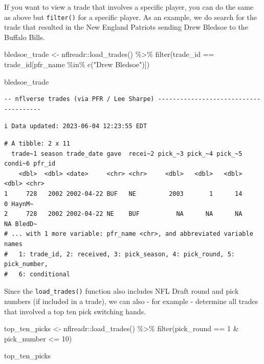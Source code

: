 \documentclass[
  letterpaper,
]{krantz}
\newenvironment{Shaded}{\begin{snugshade}}{\end{snugshade}}
\newcommand{\DecValTok}[1]{\textcolor[rgb]{0.68,0.00,0.00}{#1}}
\newcommand{\FunctionTok}[1]{\textcolor[rgb]{0.28,0.35,0.67}{#1}}
\newcommand{\NormalTok}[1]{\textcolor[rgb]{0.00,0.23,0.31}{#1}}
\newcommand{\OtherTok}[1]{\textcolor[rgb]{0.00,0.23,0.31}{#1}}
\newcommand{\SpecialCharTok}[1]{\textcolor[rgb]{0.37,0.37,0.37}{#1}}
\newcommand{\StringTok}[1]{\textcolor[rgb]{0.13,0.47,0.30}{#1}}
\begin{document}
If you want to view a trade that involves a specific player, you can do
the same as above but \texttt{filter()} for a specific player. As an
example, we do search for the trade that resulted in the New England
Patriots sending Drew Bledsoe to the Buffalo Bills.

\begin{Shaded}
\begin{Highlighting}[]
\NormalTok{bledsoe\_trade }\OtherTok{\textless{}{-}}\NormalTok{ nflreadr}\SpecialCharTok{::}\FunctionTok{load\_trades}\NormalTok{() }\SpecialCharTok{\%\textgreater{}\%}
  \FunctionTok{filter}\NormalTok{(trade\_id }\SpecialCharTok{==}\NormalTok{ trade\_id[pfr\_name }\SpecialCharTok{\%in\%} \FunctionTok{c}\NormalTok{(}\StringTok{"Drew Bledsoe"}\NormalTok{)])}

\NormalTok{bledsoe\_trade}
\end{Highlighting}
\end{Shaded}

\begin{verbatim}
-- nflverse trades (via PFR / Lee Sharpe) --------------------------------------
\end{verbatim}

\begin{verbatim}
i Data updated: 2023-06-04 12:23:55 EDT
\end{verbatim}

\begin{verbatim}
# A tibble: 2 x 11
  trade~1 season trade_date gave  recei~2 pick_~3 pick_~4 pick_~5 condi~6 pfr_id
    <dbl>  <dbl> <date>     <chr> <chr>     <dbl>   <dbl>   <dbl>   <dbl> <chr> 
1     728   2002 2002-04-22 BUF   NE         2003       1      14       0 HaynM~
2     728   2002 2002-04-22 NE    BUF          NA      NA      NA      NA BledD~
# ... with 1 more variable: pfr_name <chr>, and abbreviated variable names
#   1: trade_id, 2: received, 3: pick_season, 4: pick_round, 5: pick_number,
#   6: conditional
\end{verbatim}

Since the \texttt{load\_trades()} function also includes NFL Draft round
and pick numbers (if included in a trade), we can also - for example -
determine all trades that involved a top ten pick switching hands.

\begin{Shaded}
\begin{Highlighting}[]
\NormalTok{top\_ten\_picks }\OtherTok{\textless{}{-}}\NormalTok{ nflreadr}\SpecialCharTok{::}\FunctionTok{load\_trades}\NormalTok{() }\SpecialCharTok{\%\textgreater{}\%}
  \FunctionTok{filter}\NormalTok{(pick\_round }\SpecialCharTok{==} \DecValTok{1} \SpecialCharTok{\&}\NormalTok{ pick\_number }\SpecialCharTok{\textless{}=} \DecValTok{10}\NormalTok{)}

\NormalTok{top\_ten\_picks}
\end{Highlighting}
\end{Shaded}
\end{document}
